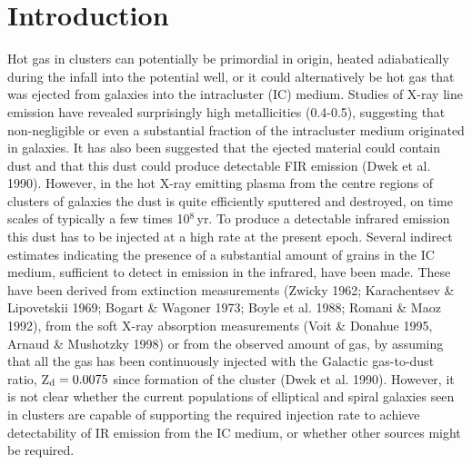 \documentclass[]{aa}
\begin{document}

%
\section{Introduction}

Hot gas in clusters can potentially be primordial in origin, heated
adiabatically during the infall into the potential well, or it could 
alternatively be 
hot gas that was ejected from galaxies into the intracluster (IC) medium. 
Studies of X-ray
line emission have revealed surprisingly high metallicities (0.4-0.5),
suggesting that non-negligible or even a substantial fraction of the 
intracluster medium originated in
galaxies. It has also been suggested that the ejected material could 
contain dust and that this dust could produce detectable FIR
emission (Dwek et al. 1990). However, in the hot X-ray emitting plasma from the
centre regions of clusters of galaxies the dust is quite efficiently sputtered 
and destroyed, on time scales of typically a few times 10$^{8}\,$yr. 
To produce a detectable infrared emission this dust has to be injected at a 
high rate at the present epoch. 
Several indirect estimates indicating the presence of a substantial amount of 
grains in the IC medium, sufficient to detect in emission in the infrared, 
have been made. These have been derived from extinction measurements 
(Zwicky 1962; Karachentsev \& Lipovetskii 1969; Bogart \& Wagoner 1973; 
Boyle et al. 1988; Romani \& Maoz 1992), from the soft X-ray absorption 
measurements (Voit \& Donahue 1995, Arnaud \& Mushotzky 1998) or from the 
observed amount of gas, by assuming that all the gas has been 
continuously injected with the 
Galactic gas-to-dust ratio, Z$_{\rm d}=0.0075$ since formation
of the cluster (Dwek et al. 1990).
However, it is not clear whether   
the current populations of elliptical and spiral galaxies seen 
in clusters are capable of supporting the  
required injection rate to achieve detectability of IR emission from the 
IC medium, or whether other sources might be required.
\end{document}
